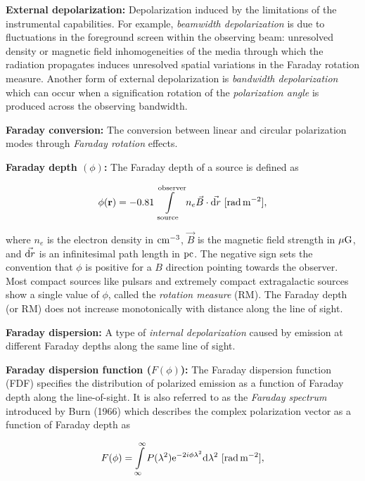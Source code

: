 \documentclass[a4paper,10pt]{article}
\begin{document}
{\noindent}\textbf{External depolarization:} Depolarization induced by the limitations of the instrumental capabilities. For example, \textit{beamwidth depolarization} is due to fluctuations in the foreground screen within the observing beam: unresolved density or magnetic field inhomogeneities of the media through which the radiation propagates induces unresolved spatial variations in the Faraday rotation measure. Another form of external depolarization is \textit{bandwidth depolarization} which can occur when a signification rotation of the \textit{polarization angle} is produced across the observing bandwidth.

{\noindent}\textbf{Faraday conversion:} The conversion between linear and circular polarization modes through \textit{Faraday rotation} effects.

{\noindent}\textbf{Faraday depth $(\phi)$:} The Faraday depth of a source is defined as

\begin{align*}
    \phi(\mathbf{r}) = -0.81 \int\limits_\mathrm{source}^\mathrm{observer}n_e\vec{B}\cdot\vec{{\rm d}r} ~ [{\rm rad\,m^{-2}}],
\end{align*}

{\noindent}where $n_e$ is the electron density in ${\rm cm^{-3}}$, $\vec{B}$ is the magnetic field strength in $\mu{\rm G}$, and $\vec{{\rm d}r}$ is an infinitesimal path length in ${\rm pc}$. The negative sign sets the convention that $\phi$ is positive for a $B$ direction pointing towards the observer. Most compact sources like pulsars and extremely compact extragalactic sources show a single value of $\phi$, called the \textit{rotation measure} (RM). The Faraday depth (or RM) does not increase monotonically with distance along the line of sight.

{\noindent}\textbf{Faraday dispersion:} A type of \textit{internal depolarization} caused by emission at different Faraday depths along the same line of sight. 

{\noindent}\textbf{Faraday dispersion function ($F(\phi)$):} The Faraday dispersion function (FDF) specifies the distribution of polarized emission as a function of Faraday depth along the line-of-sight. It is also referred to as the \textit{Faraday spectrum} introduced by Burn (1966) which describes the complex polarization vector as a function of Faraday depth as

\begin{align*}
    F(\phi) = \int\limits_{\infty}^\infty P(\lambda^2)\mathrm{e}^{-2i\phi\lambda^2}\mathrm{d}\lambda^2 ~ [{\rm rad\,m^{-2}}],
\end{align*}
\end{document}
